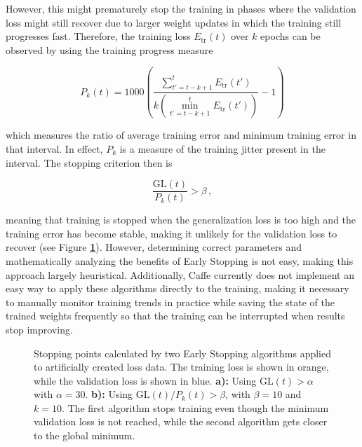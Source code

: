 However, this might prematurely stop the training in phases where the validation loss might still recover due to larger weight updates in which the training still progresses fast. Therefore, the training loss $E_{\text{tr}}(t)$ over $k$ epochs can be observed by using the training progress measure

\[ P_k(t) = 1000 \left ( \frac{\sum_{t' = t - k + 1}^{t} E_{\text{tr}}(t')}{k (\min_{t' = t - k + 1}^{t} E_{\text{tr}}(t'))} - 1 \right ) \]

\noindent which measures the ratio of average training error and minimum training error in that interval. In effect, $P_k$ is a measure of the training jitter present in the interval. The stopping criterion then is 

\[ \frac{\text{GL}(t)}{P_k(t)} > \beta \,, \]

\noindent meaning that training is stopped when the generalization loss is too high and the training error has become stable, making it unlikely for the validation loss to recover (see Figure \textbf{\ref{fig:early_stopping}}). However, determining correct parameters and mathematically analyzing the benefits of Early Stopping is not easy, making this approach largely heuristical. Additionally, Caffe currently does not implement an easy way to apply these algorithms directly to the training, making it necessary to manually monitor training trends in practice while saving the state of the trained weights frequently so that the training can be interrupted when results stop improving.


\begin {figure}[!htb]
	\begin{center}
		\scalebox{0.7}{}
	\end{center}
	\caption[Early stopping.]{Stopping points calculated by two Early Stopping algorithms applied to artificially created loss data. The training loss is shown in orange, while the validation loss is shown in blue. \textbf{a):} Using $\text{GL}(t) > \alpha$ with $\alpha = 30$. \textbf{b):} Using $\text{GL}(t)/P_k(t) > \beta$, with $\beta = 10$ and $k = 10$. The first algorithm stops training even though the minimum validation loss is not reached, while the second algorithm gets closer to the global minimum. }
	\label{fig:early_stopping}
\end {figure}


